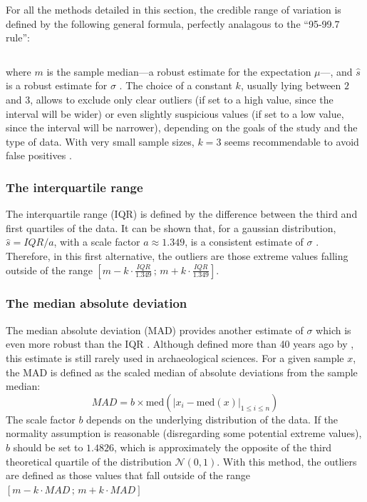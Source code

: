 \documentclass[review, 3p]{elsarticle}
\newcommand{\med}{\text{med}}
\begin{document}
For all the methods detailed in this section, the credible range of variation is defined by the following general formula, perfectly analagous to the ``95-99.7 rule'': 

\begin{equation}
[m - k \cdot \hat{s} \, ; \, m + k \cdot \hat{s}] \label{eq:formula_loc_scale_univ}
\end{equation}

where \(m\) is the sample median---a robust estimate for the expectation \(\mu\)---, and \(\hat{s}\) is a robust estimate for \(\sigma\) \citep{dorazio2017_OutlierDetectionRemarks}. The choice of a constant \(k\), usually lying between \(2\) and \(3\), allows to exclude only clear outliers (if set to a high value, since the interval will be wider) or even slightly suspicious values (if set to a low value, since the interval will be narrower), depending on the goals of the study and the type of data. With very small sample sizes, \(k = 3\) seems recommendable to avoid false positives \citep{leys2019_HowClassifyDetect}.

\subsubsection{The interquartile range}
\label{sec:org52409e3}
The interquartile range (IQR) is defined by the difference between the third and first quartiles of the data. It can be shown that, for a gaussian distribution, \(\hat{s} = IQR / a\), with a scale factor \(a \approx 1.349\), is a consistent estimate of \(\sigma\) \citep{wan2014_EstimatingSampleMean}. Therefore, in this first alternative, the outliers are those extreme values falling outside of the range \([m - k \cdot \frac{IQR}{1.349} \, ; \, m + k \cdot \frac{IQR}{1.349}]\).
\subsubsection{The median absolute deviation}
\label{sec:orgd78e471}
The median absolute deviation (MAD) provides another estimate of \(\sigma\) which is even more robust than the IQR \citep{rousseeuw1993_AlternativesMedianAbsolute}. Although defined more than 40 years ago by \cite{hampel1974_InfluenceCurveIts}, this estimate is still rarely used in archaeological sciences. For a given sample \(x\), the MAD is defined as the scaled median of absolute deviations from the sample median:
\begin{equation}
MAD = b \times \med (|x_i - \med(x)|_{1 \leq i \leq n})  \label{eq:mad}
\end{equation}
The scale factor \(b\) depends on the underlying distribution of the data. If the normality assumption is reasonable (disregarding some potential extreme values), \(b\) should be set to \(1.4826\), which is approximately the opposite of the third theoretical quartile of the distribution \(\mathcal{N}(0,1)\). With this method, the outliers are defined as those values that fall outside of the range \([m - k \cdot MAD \, ; \, m + k \cdot MAD]\)
\end{document}
